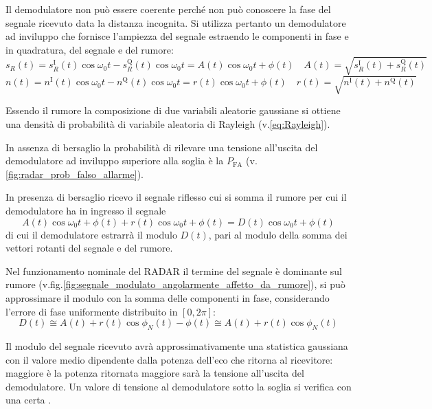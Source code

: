Il demodulatore non può essere coerente perché non può conoscere la fase del segnale ricevuto data la distanza incognita. Si utilizza pertanto un demodulatore ad inviluppo che fornisce l'ampiezza del segnale estraendo le componenti in fase e in quadratura, del segnale e del rumore:
\begin{equation}
s_R(t)=s_R^\text{I}(t)\cos{\omega_0 t}-s_R^\text{Q}(t)\cos{\omega_0 t}=A(t)\cos{\omega_0 t+\phi(t)}\quad A(t)=\sqrt{s_R^\text{I}(t)+s_R^\text{Q}(t)}
\end{equation}
\begin{equation}
n(t)=n^\text{I}(t)\cos{\omega_0 t}-n^\text{Q}(t)\cos{\omega_0 t}=r(t)\cos{\omega_0 t+\phi(t)}\quad r(t)=\sqrt{n^\text{I}(t)+n^\text{Q}(t)}
\end{equation}

Essendo il rumore la composizione di due variabili aleatorie gaussiane si ottiene una densità di probabilità di variabile aleatoria di Rayleigh (v.\ref{eq:Rayleigh}). 

In assenza di bersaglio la probabilità di rilevare una tensione all'uscita del demodulatore ad inviluppo superiore alla soglia è la  $P_\text{FA}$ (v.\ref{fig:radar_prob_falso_allarme}).

In presenza di bersaglio ricevo il segnale riflesso cui si somma il rumore per cui il demodulatore ha in ingresso il segnale
\begin{equation}
A(t)\cos{\omega_0 t+\phi(t)}+r(t)\cos{\omega_0 t+\phi(t)}=D(t)\cos{\omega_0 t+\phi(t)}
\end{equation}
di cui il demodulatore estrarrà il modulo $D(t)$, pari al modulo della somma dei vettori rotanti del segnale e del rumore. 

Nel funzionamento nominale del \ac{RADAR} il termine del segnale è dominante sul rumore (v.fig.\ref{fig:segnale_modulato_angolarmente_affetto_da_rumore}), si può approssimare il modulo con la somma delle componenti in fase, considerando l'errore di fase uniformente distribuito in $[0,2\pi]$:
\[D(t)\cong A(t)+r(t)\cos{\phi_N(t)-\phi(t)}\cong A(t)+r(t)\cos{\phi_N(t)}\]

Il modulo del segnale ricevuto avrà approssimativamente una statistica gaussiana con il valore medio dipendente dalla potenza dell'eco che ritorna al ricevitore: maggiore è la potenza ritornata maggiore sarà la tensione all'uscita del demodulatore. Un valore di tensione al demodulatore sotto la soglia si verifica con una certa .

